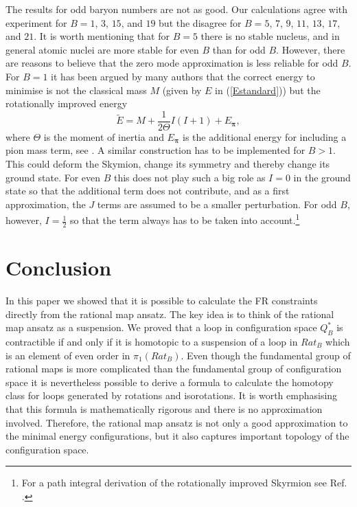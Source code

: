 \documentclass[a4paper,12pt]{article}
\def\vecpi{{\pmb{\pi}}}
\begin{document}
The results for odd baryon numbers are not as good.
Our calculations agree with experiment for $B=1$, $3$, $15$, and $19$ but 
the disagree for $B = 5$, $7$, $9$, $11$, $13$, $17$, and $21$.
It is worth mentioning that for $B=5$ there is no stable nucleus, and 
in general atomic nuclei are more stable for even $B$ than for odd $B$.
%
However, there are reasons to believe that the zero mode 
approximation is less reliable for odd $B$. 
For $B=1$ it has been argued by many authors 
that the correct energy to minimise is not the classical mass $M$ (given 
by $E$ in (\ref{Estandard})) but the rotationally improved energy 
%
\begin{equation}
{\tilde E} = M + \frac{1}{2 \Theta} I(I+1) + E_{\vecpi},
\end{equation}
%
where $\Theta$ is the moment of inertia and $E_{\vecpi}$ is the 
additional energy for including a pion mass term, see 
\cite{Rajaraman:1986ty}. A similar construction 
has to be implemented for $B>1$. This could deform the 
Skymion, change its symmetry and thereby change its ground state.
For even $B$ this does not play such a big role as $I=0$ in the 
ground state so that the additional term does not contribute, and
as a first approximation, the $J$ terms are assumed to be a smaller 
perturbation. For odd $B$, however, $I= \frac{1}{2}$ so that the term 
always has to be taken into account.\footnote{For a path integral 
derivation of the rotationally improved Skyrmion see Ref. 
\cite{Dorey:1994fk}.} 


\section{Conclusion}

In this paper we showed that it is possible to calculate the FR 
constraints directly from the rational map ansatz. The key idea is to 
think of the rational map ansatz as a suspension. We proved that a loop 
in configuration space $Q_B^*$ is contractible if and only if it is 
homotopic to a suspension of a loop in $Rat_B$ which is 
an element of even order in $\pi_1(Rat_B)$. 
Even though the fundamental group of rational maps is more 
complicated than the fundamental group of configuration space it is 
nevertheless possible to derive a formula to calculate the 
homotopy class for loops generated by rotations 
and isorotations. It is worth emphasising that this formula is 
mathematically rigorous and there is no approximation involved. Therefore, 
the rational map ansatz is not only a good approximation to the minimal 
energy configurations, but it also captures important topology of the
configuration space.
\end{document}
